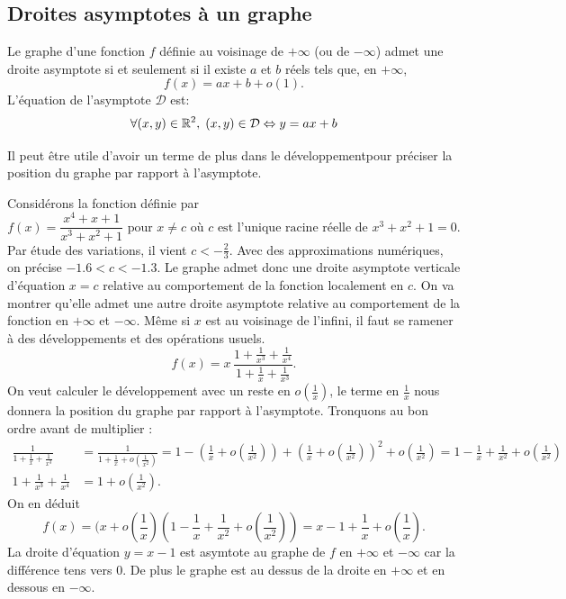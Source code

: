 \subsection{Droites asymptotes à un graphe}
\begin{defi}
 Le graphe d'une fonction $f$ définie au voisinage de $+\infty$ (ou de $-\infty$) admet une droite asymptote si et seulement si il existe $a$ et $b$ réels tels que, en $+\infty$,
\[
 f(x) = ax + b + o(1).
\]
L'équation de l'asymptote $\mathcal{D}$ est: 
\[
 \forall (x,y) \in \mathbb{R}^2, \; (x,y)\in \mathcal{D} \Leftrightarrow y = ax+b
\]
\end{defi}
Il peut être utile d'avoir un terme de plus dans le développementpour préciser la position du graphe par rapport à l'asymptote.
\begin{exple}
Considérons la fonction définie par 
\[
  f(x) = \frac{x^4 + x + 1}{x^3 + x^2 + 1} \text{ pour } x \neq c \text{ où } c \text{ est l'unique racine réelle de } x^3 + x^2 + 1 =0.
\]
Par étude des variations, il vient $c< -\frac{2}{3}$. Avec des approximations numériques, on précise $-1.6 < c < -1.3$. Le graphe admet donc une droite asymptote verticale d'équation $x = c$ relative au comportement de la fonction localement en $c$. On va montrer qu'elle admet une autre droite asymptote relative au comportement de la fonction en $+\infty$ et $-\infty$.\newline  
Même si $x$ est au voisinage de l'infini, il faut se ramener à des développements et des opérations usuels.
\[
 f(x) = x \,\frac{1 + \frac{1}{x^3} + \frac{1}{x^4}}{1 + \frac{1}{x} + \frac{1}{x^3}}.
\]
On veut calculer le développement avec un reste en $o(\frac{1}{x})$, le terme en $\frac{1}{x}$ nous donnera la position du graphe par rapport à l'asymptote. Tronquons au bon ordre avant de multiplier :
\begin{align*}
 \frac{1}{1+\frac{1}{x} + \frac{1}{x^3}} &= \frac{1}{1+\frac{1}{x} + o(\frac{1}{x^2})}
 = 1 -\left( \frac{1}{x} + o(\frac{1}{x^2})\right) + \left( \frac{1}{x} + o(\frac{1}{x^2})\right)^2 + o(\frac{1}{x^2})
 = 1 - \frac{1}{x} + \frac{1}{x^2} + o(\frac{1}{x^2})\\
1 + \frac{1}{x^3} + \frac{1}{x^4} &= 1 + o(\frac{1}{x^2}). 
\end{align*}
On en déduit
\[
  f(x) = (x + o(\frac{1}{x})(1 - \frac{1}{x} + \frac{1}{x^2} + o(\frac{1}{x^2}))
  = x - 1 + \frac{1}{x} + o(\frac{1}{x}).
\]
La droite d'équation $y = x - 1$ est asymtote au graphe de $f$ en $+\infty$ et $-\infty$ car la différence tens vers $0$. De plus le graphe est au dessus de la droite en $+\infty$ et en dessous en $-\infty$.
\end{exple}

